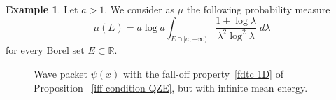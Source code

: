 \documentclass[aip,jmp,12pt
]{revtex4}
\newcommand{\RM}{\mathbb{R}}
\theoremstyle{definition}
\newtheorem{example}{Example}
\begin{document}
\begin{example}
\label{ex:part}
Let $a>1$. We consider as $\mu$ the following probability measure
\begin{equation}
\label{eq:muexamp}
\mu(E)= a \log a \int_{E \cap [a, +\infty)} \frac{1+\log \lambda}{\lambda^2 \log^2 \lambda} \; d\lambda
\end{equation}
for every Borel set $E\subset\RM$.


\begin{figure}
\centering
{}
\caption{Wave packet $\psi(x)$ with the fall-off property~\ref{fdtc 1D} of Proposition ~\ref{iff condition QZE}, but with infinite mean energy.}
\label{fig:1}       %
\end{figure}


\end{example}
\end{document}
